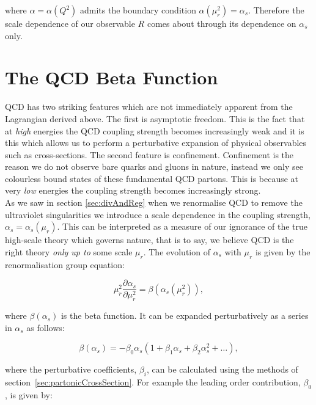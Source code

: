 		where $\alpha=\alpha(Q^2)$ admits the boundary condition $\alpha(\mu_r^2)=\alpha_s$.  Therefore the scale dependence
		of our observable $R$ comes about through its dependence on $\alpha_s$ only.

\section{The QCD Beta Function}
	\label{sec:betaFunction}

	QCD has two striking features which are not immediately apparent from the Lagrangian derived above.  The first is asymptotic freedom.
	This is the fact that at \emph{high} energies the QCD coupling strength becomes increasingly weak and it is this which allows us to
	perform a perturbative expansion of physical observables such as cross-sections.  The second feature is confinement.  Confinement
	is the reason we do not observe bare quarks and gluons in nature, instead we only see colourless bound states of these fundamental QCD partons.
	This is because at very \emph{low} energies the coupling strength becomes increasingly strong.\\As we saw in section \ref{sec:divAndReg}
	when we renormalise QCD to remove the ultraviolet singularities we introduce a scale dependence in the coupling strength,
	$\alpha_s = \alpha_s(\mu_r)$.  This can be interpreted as a measure of our ignorance of the true high-scale theory which governs nature,
	that is to say, we believe QCD is the right theory \emph{only up to} some scale $\mu_r$.  The evolution of $\alpha_s$ with $\mu_r$ is
	given by the renormalisation group equation:

	\begin{equation}
		\mu_r^2\frac{\partial\alpha_s}{\partial \mu_r^2} = \beta(\alpha_s(\mu_r^2)),
		\label{eqn:RSFlow}
	\end{equation}

	where $\beta(\alpha_s)$ is the beta function.  It can be expanded perturbatively as a series in $\alpha_s$
	as follows:

	\begin{equation}
		\beta(\alpha_s) = -\beta_0\alpha_s\left(1 + \beta_1\alpha_s + \beta_2\alpha_s^2 + \ldots \right),
		\label{eqn:betaFunction}
	\end{equation}

	where the perturbative coefficients, $\beta_i$, can be calculated using the methods of section~\eqref{sec:partonicCrossSection}.
	For example the leading order contribution, $\beta_0$, is given by:

